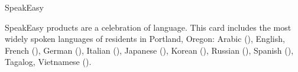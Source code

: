 \documentclass[10pt,letter]{article}
\begin{document}

\begin{insideleft} %

  \vfill

  \begin{center}
    \normalsize
    SpeakEasy
  \end{center}

  \vfill

  \footnotesize

  \aboutSpeakEasy{}

  \vfill

  SpeakEasy products are a celebration of language. This card includes the most
  widely spoken languages of residents in Portland, Oregon:
  Arabic (\textarabic{\langArabic{}}),
  English, %
  French (\textfrench{\langFrench{}}),
  German (\textgerman{\langGerman{}}),
  Italian (\textitalian{\langItalian{}}),
  Japanese ({\japanesefont{}\langJapanese{}}),
  Korean ({\koreanfont{}\langKorean{}}),
  Russian (\textrussian{\langRussian{}}),
  Spanish (\textspanish{\langSpanish{}}),
  Tagalog, %
  Vietnamese (\textvietnamese{\langVietnamese{}}).

  \vfill

  \elephantPaper{}

  \vfill

  \ccZeroNotice{}

  \vfill

  \githubReference{}

  \vfill


  \vfill

\end{insideleft} %



\end{document}
